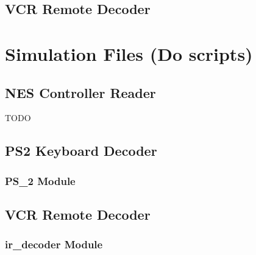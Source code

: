 \documentclass[a4paper]{article}
\makeatletter
\newcommand{\filecaption}[1]{\filename@parse{#1}\filename@base.\filename@ext}
\newcommand{\filelisting}[2][]{%
}
\makeatother
\begin{document}
\subsection{VCR Remote Decoder}
\filelisting[label=lst:sv_vcr_ir_decoder]{../verilog/vcr_remote/ir_decoder.sv}
\filelisting[label=lst:sv_vcr_ir_signal_transcriber]{../verilog/vcr_remote/ir_signal_transcriber.sv}
\filelisting[label=lst:sv_vcr_sync_counter]{../verilog/vcr_remote/sync_counter.sv}
\filelisting[label=lst:sv_vcr_counter]{../verilog/vcr_remote/counter.sv}
\filelisting[label=lst:sv_vcr_sync]{../verilog/vcr_remote/sync.sv}
\filelisting[label=lst:sv_vcr_shiftreg]{../verilog/vcr_remote/shiftreg.sv}
\filelisting[label=lst:sv_vcr_checksum_validator]{../verilog/vcr_remote/checksum_validator.sv}
\filelisting[label=lst:sv_vcr_ir_code_decoder]{../verilog/vcr_remote/ir_code_decoder.sv}

\section{Simulation Files (Do scripts)}

\subsection{NES Controller Reader}
TODO

\subsection{PS2 Keyboard Decoder}

\subsubsection{PS\_2 Module}
\filelisting[label=lst:sim_ps2_ps_2]{../do_files/ps2/PS2.do}

\subsection{VCR Remote Decoder}

\subsubsection{ir\_decoder Module}
\filelisting{../do_files/vcr_remote/setup.do}
\filelisting{../do_files/vcr_remote/reset.do}
\filelisting[label=lst:sim_vcr_ir_decoder_0]{../do_files/vcr_remote/0.do}
\filelisting[label=lst:sim_vcr_ir_decoder_1]{../do_files/vcr_remote/1.do}
\filelisting[label=lst:sim_vcr_ir_decoder_2]{../do_files/vcr_remote/2.do}
\filelisting[label=lst:sim_vcr_ir_decoder_3]{../do_files/vcr_remote/3.do}
\filelisting[label=lst:sim_vcr_ir_decoder_4]{../do_files/vcr_remote/4.do}
\filelisting[label=lst:sim_vcr_ir_decoder_5]{../do_files/vcr_remote/5.do}
\filelisting[label=lst:sim_vcr_ir_decoder_6]{../do_files/vcr_remote/6.do}
\filelisting[label=lst:sim_vcr_ir_decoder_7]{../do_files/vcr_remote/7.do}
\filelisting[label=lst:sim_vcr_ir_decoder_8]{../do_files/vcr_remote/8.do}
\filelisting[label=lst:sim_vcr_ir_decoder_9]{../do_files/vcr_remote/9.do}
\filelisting[label=lst:sim_vcr_ir_decoder_sequence]{../do_files/vcr_remote/sequence.do}
\filelisting[label=lst:sim_vcr_ir_decoder_bad_checksum]{../do_files/vcr_remote/bad_checksum.do}

\printbibliography
\end{document}
